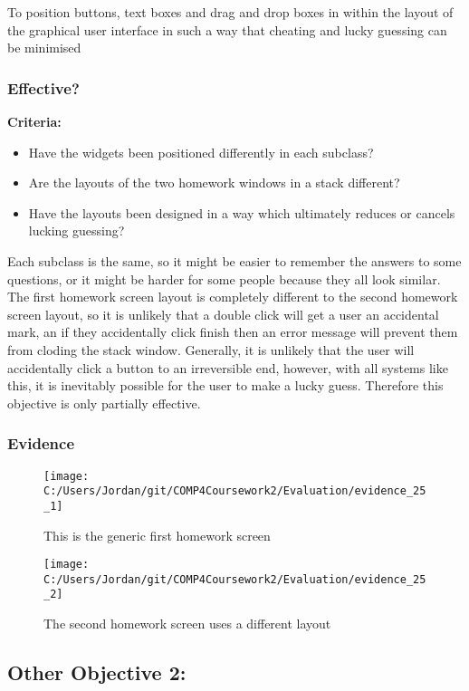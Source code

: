 To position buttons, text boxes and drag and drop boxes in within the layout of the graphical user interface in such a way that cheating and lucky guessing can be minimised

\subsubsection{Effective?}

\textbf{Criteria: }

\begin{itemize}
	\item Have the widgets been positioned differently in each subclass?
	\item Are the layouts of the two homework windows in a stack different?
	\item Have the layouts been designed in a way which ultimately reduces or cancels lucking guessing?
\end{itemize}

Each subclass is the same, so it might be easier to remember the answers to some questions, or it might be harder for some people because they all look similar. The first homework screen layout is completely different to the second homework screen layout, so it is unlikely that a double click will get a user an accidental mark, an if they accidentally click finish then an error message will prevent them from cloding the stack window. Generally, it is unlikely that the user will accidentally click a button to an irreversible end, however, with all systems like this, it is inevitably possible for the user to make a lucky guess. Therefore this objective is only partially effective.

\subsubsection{Evidence}

\begin{figure}[H]
	\texttt{[image: C:/Users/Jordan/git/COMP4Coursework2/Evaluation/evidence\_25\_1]}
	\caption{This is the generic first homework screen}
\end{figure}

\begin{figure}[H]
	\texttt{[image: C:/Users/Jordan/git/COMP4Coursework2/Evaluation/evidence\_25\_2]}
	\caption{The second homework screen uses a different layout}
\end{figure}

\subsection{Other Objective 2: }

